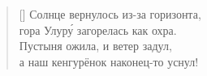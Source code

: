 \documentclass[a5paper,11pt]{memoir}
\begin{document}

\begin{verse}[\versewidth]
Солнце вернулось из-за горизонта,\\
гора Улур\'{у} загорелась как охра.\\
Пустыня ожила, и ветер задул,\\
а наш кенгурёнок наконец-то уснул!
\end{verse}

\label{uluru}
\BgThispage
\end{document}
